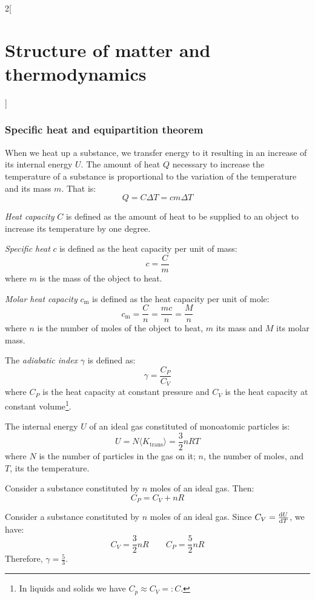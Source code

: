 \documentclass[../../../main.tex]{subfiles}
\begin{document}
\begin{multicols}{2}[\section{Structure of matter and thermodynamics}]
  \subsubsection{Specific heat and equipartition theorem}
  \begin{definition}
    When we heat up a substance, we transfer energy to it resulting in an increase of its internal energy $U$. The amount of heat $Q$ necessary to increase the temperature of a substance is proportional to the variation of the temperature and its mass $m$. That is:
    $$Q=C\Delta T=cm\Delta T$$
  \end{definition}
  \begin{definition}
    \emph{Heat capacity} $C$ is defined as the amount of heat to be supplied to an object to increase its temperature by one degree.
  \end{definition}
  \begin{definition}
    \emph{Specific heat} $c$ is defined as the heat capacity per unit of mass: $$c=\frac{C}{m}$$ where $m$ is the mass of the object to heat.
  \end{definition}
  \begin{definition}
    \emph{Molar heat capacity} $c_\text{m}$ is defined as the heat capacity per unit of mole: $$c_\text{m}=\frac{C}{n}=\frac{mc}{n}=\frac{M}{n}$$ where $n$ is the number of moles of the object to heat, $m$ its mass and $M$ its molar mass.
  \end{definition}
  \begin{definition}
    The \emph{adiabatic index} $\gamma$ is defined as:
    $$\gamma=\frac{C_P}{C_V}$$
    where $C_P$ is the heat capacity at constant pressure and $C_V$ is the heat capacity at constant volume\footnote{In liquids and solids we have $C_p\approx C_V=:C$.}.
  \end{definition}
  \begin{definition}
    The internal energy $U$ of an ideal gas constituted of monoatomic particles is:
    $$U=N\langle K_\text{trans}\rangle=\frac{3}{2}nRT$$
    where $N$ is the number of particles in the gas on it; $n$, the number of moles, and $T$, its the temperature.
  \end{definition}
  \begin{proposition}
    Consider a substance constituted by $n$ moles of an ideal gas. Then:
    $$C_P=C_V+nR$$
  \end{proposition}
  \begin{proposition}
    Consider a substance constituted by $n$ moles of an ideal gas. Since $C_V=\dv{U}{T}$, we have: $$C_V=\frac{3}{2}nR\qquad C_P=\frac{5}{2}nR$$ Therefore, $\gamma=\frac{5}{3}$.

\end{proposition}
\end{multicols}
\end{document}
